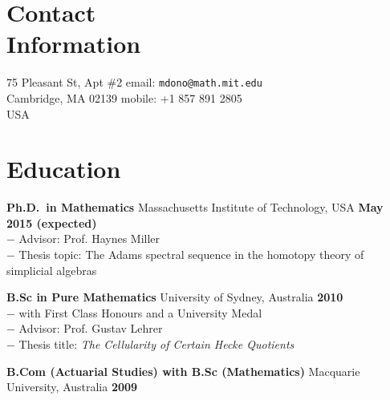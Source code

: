 \documentclass[margin,line]{resume}
\newcommand{\award}[3]{\textbf{#1} #2 \hfill \textbf{#3}
           
\vspace{-2.3mm}}
\newcommand{\twolineaward}[4]{\textbf{#1} #2 \hfill \textbf{#4}\\%
#3
           
\vspace{-2.3mm}}
\begin{document}
\begin{resume}

\vspace{4mm}
    \section{\mysidestyle Contact\\Information}

    75 Pleasant St, Apt \#2                 \hfill email: \texttt{mdono@math.mit.edu}                 
\vspace{0mm}\\\vspace{0mm}%
    Cambridge, MA  02139                    \hfill mobile: +1 857 891 2805 \vspace{0mm}\\\hspace{-1mm} 				
    USA                                  





    \section{\mysidestyle Education}

\twolineaward{Ph.D.\ in Mathematics}{Massachusetts Institute of Technology, USA}{%
\phantom{space}$-$ Advisor: Prof. Haynes Miller\\
\phantom{space}$-$ Thesis topic: The Adams spectral sequence in the homotopy theory of simplicial algebras%
}{May 2015 (expected)}
\twolineaward{B.Sc in Pure Mathematics}{University of Sydney, Australia}{%
\phantom{space}$-$ with First Class Honours and a University Medal\\
\phantom{space}$-$ Advisor: Prof. Gustav Lehrer\\
\phantom{space}$-$ Thesis title: \emph{The Cellularity of Certain Hecke Quotients}
}{2010}
\award{B.Com (Actuarial Studies) with B.Sc (Mathematics)}{Macquarie University, Australia}{2009}


\end{resume}
\end{document}
